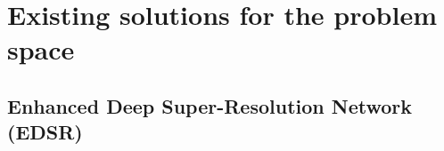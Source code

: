 
\chapter{Existing solutions for the problem space}
\ifpdf
    \graphicspath{{Chapter1/Chapter1Figs/PNG/}{Chapter1/Chapter1Figs/PDF/}{Chapter1/Chapter1Figs/}}
\else
    \graphicspath{{Chapter1/Chapter1Figs/EPS/}{Chapter1/Chapter1Figs/}}
\fi


\section{Enhanced Deep Super-Resolution Network (EDSR)}

